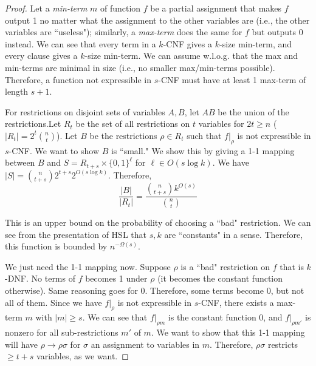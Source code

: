 \begin{proof}
Let a \emph{min-term} $m$ of function $f$ be a partial assignment that makes $f$ output 1 no matter what the assignment to the other variables are (i.e., the other variables are ``useless"); similarly, a \emph{max-term} does the same for $f$ but outputs 0 instead. We can see that every term in a $k$-CNF gives a $k$-size min-term, and every clause gives a $k$-size min-term. We can assume w.l.o.g. that the max and min-terms are minimal in size (i.e., no smaller max/min-terms possible). Therefore, a function not expressible in $s$-CNF must have at least 1 max-term of length $s+1$. 

\par For restrictions on disjoint sets of variables $A, B$, let $AB$ be the union of the restrictions.Let $R_t$ be the set of all restrictions on $t$ variables for $2t \ge n$ ($|R_t| = 2^t{n \choose t}$). Let $B$ be the restrictions $\rho \in R_t$ such that $f\vert_\rho$ is not expressible in $s$-CNF. We want to show $B$ is ``small." We show this by giving a 1-1 mapping between $B$ and $S = R_{t+s} \times \{0, 1\}^\ell$ for $\ell \in O(s \log k)$. We have $|S| = {n \choose t+s}2^{t+s}2^{O(s \log k)}$. Therefore,
\[
\frac{|B|}{|R_t|} = \frac{{n \choose t+s}k^{O(s)}}{{n \choose t}}
\]

\par This is an upper bound on the probability of choosing a ``bad" restriction. We can see from the presentation of HSL that $s, k$ are ``constants" in a sense. Therefore, this function is bounded by $n^{-\Omega(s)}$. 

\par We just need the 1-1 mapping now. Suppose $\rho$ is a ``bad" restriction on $f$ that is $k$-DNF. No terms of $f$ becomes 1 under $\rho$ (it becomes the constant function otherwise). Same reasoning goes for 0. Therefore, some terms become 0, but not all of them. Since we have $f\vert_\rho$ is not expressible in $s$-CNF, there exists a max-term $m$ with $|m| \ge s$. We can see that $f\vert_{\rho m}$ is the constant function 0, and $f\vert_{\rho m'}$ is nonzero for all sub-restrictions $m'$ of $m$. We want to show that this 1-1 mapping will have $\rho \rightarrow \rho\sigma$ for $\sigma$ an assignment to variables in $m$. Therefore, $\rho\sigma$ restricts $\ge t+s$ variables, as we want.


\end{proof}

